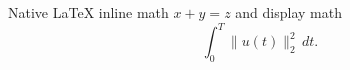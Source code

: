 \documentclass{article}
\begin{document}
Native LaTeX inline math \(x+y=z\) and display math
\[
\int_0^T \lVert u(t)\rVert_2^2\,dt.
\]
\end{document}
